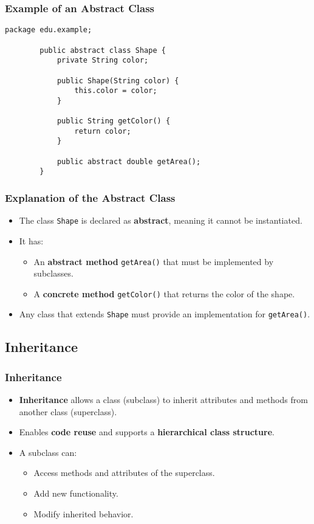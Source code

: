 \documentclass[aspectratio=169, table]{beamer}
\begin{document}
\begin{frame}[fragile]
	\frametitle{Example of an Abstract Class}
	
	\begin{lstlisting}[style=JavaStyle, caption={Example of an Abstract Class: \texttt{Shape.java}}]
		package edu.example;
		
		public abstract class Shape {
			private String color;
			
			public Shape(String color) {
				this.color = color;
			}
			
			public String getColor() {
				return color;
			}
			
			public abstract double getArea();
		}
	\end{lstlisting}
\end{frame}

\begin{frame}[fragile]
	\frametitle{Explanation of the Abstract Class}
	
	\begin{itemize}
		\item The class \texttt{Shape} is declared as \textbf{abstract}, meaning it cannot be instantiated.
		\item It has:
		\begin{itemize}
			\item An \textbf{abstract method} \texttt{getArea()} that must be implemented by subclasses.
			\item A \textbf{concrete method} \texttt{getColor()} that returns the color of the shape.
		\end{itemize}
		\item Any class that extends \texttt{Shape} must provide an implementation for \texttt{getArea()}.
	\end{itemize}
\end{frame}

\subsection{Inheritance}
\begin{frame}[fragile]
	\frametitle{Inheritance}
	
	\begin{itemize}
		\item \textbf{Inheritance} allows a class (subclass) to inherit attributes and methods from another class (superclass).
		\item Enables \textbf{code reuse} and supports a \textbf{hierarchical class structure}.
		\item A subclass can:
		\begin{itemize}
			\item Access methods and attributes of the superclass.
			\item Add new functionality.
			\item Modify inherited behavior.
		\end{itemize}
	\end{itemize}
\end{frame}
\end{document}
